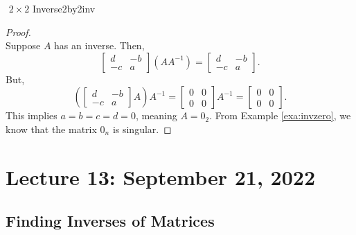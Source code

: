 \begin{theorem}{\Stop\,\,\(2\times 2\) Inverse}{2by2inv}
\begin{proof}
\begin{equation*}
                \end{equation*}
                Suppose \(A\) has an inverse. Then,
                \begin{equation*}
                    \begin{bmatrix} d & -b \\ -c & a \end{bmatrix}\left(AA^{-1}\right)=\begin{bmatrix} d & -b \\ -c & a \end{bmatrix}.
                \end{equation*}
                But,
                \begin{equation*}
                    \left(\begin{bmatrix} d & -b \\ -c & a \end{bmatrix}A\right)A^{-1}=\begin{bmatrix} 0 & 0 \\ 0 & 0 \end{bmatrix}A^{-1}=\begin{bmatrix} 0 & 0 \\ 0 & 0 \end{bmatrix}.
                \end{equation*}
                This implies \(a=b=c=d=0\), meaning \(A=0_2\). From Example \ref{exa:invzero}, we know that the matrix \(0_n\) is singular.
            \end{proof}
        \end{theorem}
        
\pagebreak

\section{Lecture 13: September 21, 2022}

    \subsection{Finding Inverses of Matrices}

